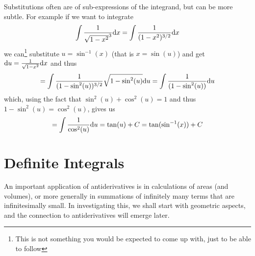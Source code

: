 Substitutions often are of sub-expressions of the integrand, but can be more
subtle. For example if we want to integrate
\[
\int \frac{1}{\sqrt{1-x^2}^3}{\mbox{d}}x
=\int \frac{1}{(1-x^2)^{3/2}}{\mbox{d}}x
\]
we can\footnote{This is not something you would be expected to come up
with, just to be able to follow} substitute $u=\sin^{-1}(x)$ (that is
$x=\sin(u)$) and get ${\mbox{d}}u=\frac{1}{\sqrt{1-x^2}}{\mbox{d}}x$ and thus
\[
=\int \frac{1}{(1-\sin^2(u))^{3/2}}\sqrt{1-\sin^2(u)}{\mbox{d}}u
=\int \frac{1}{(1-\sin^2(u))}{\mbox{d}}u
\]
which, using the fact that $\sin^2(u)+\cos^2(u)=1$ and thus
$1-\sin^2(u)=\cos^2(u)$, gives us
\[
=\int \frac{1}{\cos^2(u)}{\mbox{d}}u=\tan(u)+C=\tan(\sin^{-1}(x))+C
\]


\section{Definite Integrals}
\label{RiemannIntegral}

An important application of antiderivatives is in calculations of areas (and
volumes), or more generally in summations of infinitely many terms that are
infinitesimally small.
In investigating this, we shall start with geometric aspects, and the
connection to antiderivatives will emerge later.
\smallskip

